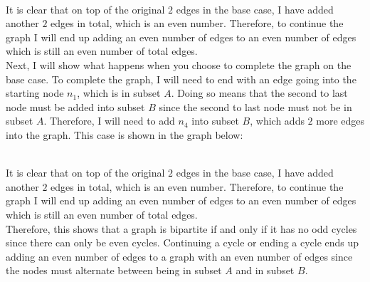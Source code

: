 \documentclass[11pt]{article}
\begin{document}
\begin{enumerate}[label=(\alph*)]
\\
It is clear that on top of the original $2$ edges in the base case, I have added another $2$ edges in total, which is an even number. Therefore, to continue the graph I will end up adding an even number of edges to an even number of edges which is still an even number of total edges.
\\
Next, I will show what happens when you choose to complete the graph on the base case. To complete the graph, I will need to end with an edge going into the starting node $n_1$, which is in subset $A$. Doing so means that the second to last node must be added into subset $B$ since the second to last node must not be in subset $A$. Therefore, I will need to add $n_4$ into subset $B$, which adds $2$ more edges into the graph. This case is shown in the graph below:
\\
\\
It is clear that on top of the original $2$ edges in the base case, I have added another $2$ edges in total, which is an even number. Therefore, to continue the graph I will end up adding an even number of edges to an even number of edges which is still an even number of total edges.
\vspace*{1\baselineskip}
\\
Therefore, this shows that a graph is bipartite if and only if it has no odd cycles since there can only be even cycles. Continuing a cycle or ending a cycle ends up adding an even number of edges to a graph with an even number of edges since the nodes must alternate between being in subset $A$ and in subset $B$.




\end{enumerate}
\end{document}
